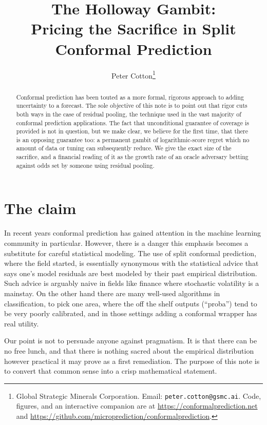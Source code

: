 \documentclass[11pt]{article}
\title{The Holloway Gambit:\\ Pricing the Sacrifice in Split Conformal Prediction}
\author{Peter Cotton\thanks{Global Strategic Minerals Corporation.
  Email: \texttt{peter.cotton@gsmc.ai}. Code, figures, and an interactive companion are at
  \url{https://conformalprediction.net} and
  \url{https://github.com/microprediction/conformalprediction}.}}
\date{}
\theoremstyle{definition}
\begin{document}
\maketitle

\begin{abstract}
\noindent
Conformal prediction has been touted as a more formal, rigorous approach to adding
uncertainty to a forecast. The sole objective of this note is to point out that rigor cuts
both ways in the case of residual pooling, the technique used in the vast majority of
conformal prediction applications. The fact that unconditional guarantee of coverage is
provided is not in question, but we make clear, we believe for the first time, that there is
an opposing guarantee too: a permanent gambit of logarithmic-score regret which no amount of
data or tuning can subsequently reduce. We give the exact size of the sacrifice, and a
financial reading of it as the growth rate of an oracle adversary betting against odds set
by someone using residual pooling.
\end{abstract}

\section{The claim}

In recent years conformal prediction has gained attention in the machine learning community
in particular. However, there is a danger this emphasis becomes a substitute for careful
statistical modeling. The use of split conformal prediction, where the field started, is
essentially synonymous with the statistical advice that says one's model residuals are best
modeled by their past empirical distribution. Such advice is arguably naive in fields like
finance where stochastic volatility is a mainstay. On the other hand there are many
well-used algorithms in classification, to pick one area, where the off the shelf outputs
(``proba'') tend to be very poorly calibrated, and in those settings adding a conformal
wrapper has real utility.

Our point is not to persuade anyone against pragmatism. It is that there can be no free
lunch, and that there is nothing sacred about the empirical distribution however practical
it may prove as a first remediation. The purpose of this note is to convert that common
sense into a crisp mathematical statement.
\end{document}
